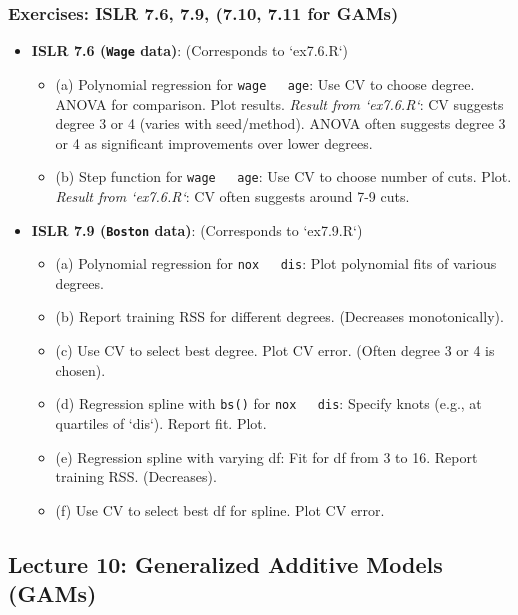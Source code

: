\documentclass[12pt,a4paper]{article}
\newcommand{\Rpackage}[1]{\texttt{#1}} %
\newcommand{\Rfunction}[1]{\texttt{#1()}} %
\newcommand{\Rcode}[1]{\texttt{#1}} %
\begin{document}
\begin{itemize}
    \subsubsection{Exercises: ISLR 7.6, 7.9, (7.10, 7.11 for GAMs)}
        \begin{itemize}
            \item \textbf{ISLR 7.6 (\Rpackage{Wage} data)}: (Corresponds to `ex7.6.R`)
                \begin{itemize}
                    \item (a) Polynomial regression for \Rcode{wage ~ age}: Use CV to choose degree. ANOVA for comparison. Plot results.
                        \textit{Result from `ex7.6.R`}: CV suggests degree 3 or 4 (varies with seed/method). ANOVA often suggests degree 3 or 4 as significant improvements over lower degrees.
                    \item (b) Step function for \Rcode{wage ~ age}: Use CV to choose number of cuts. Plot.
                        \textit{Result from `ex7.6.R`}: CV often suggests around 7-9 cuts.
                \end{itemize}
            \item \textbf{ISLR 7.9 (\Rpackage{Boston} data)}: (Corresponds to `ex7.9.R`)
                \begin{itemize}
                    \item (a) Polynomial regression for \Rcode{nox ~ dis}: Plot polynomial fits of various degrees.
                    \item (b) Report training RSS for different degrees. (Decreases monotonically).
                    \item (c) Use CV to select best degree. Plot CV error. (Often degree 3 or 4 is chosen).
                    \item (d) Regression spline with \Rfunction{bs} for \Rcode{nox ~ dis}: Specify knots (e.g., at quartiles of `dis`). Report fit. Plot.
                    \item (e) Regression spline with varying df: Fit for df from 3 to 16. Report training RSS. (Decreases).
                    \item (f) Use CV to select best df for spline. Plot CV error.
                \end{itemize}
        \end{itemize}


\subsection{Lecture 10: Generalized Additive Models (GAMs)}

\end{itemize}
\end{document}
